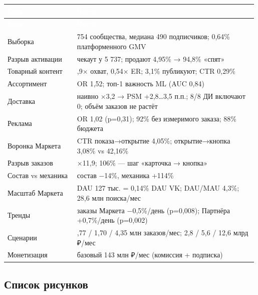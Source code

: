 \documentclass[10pt,a4paper]{article}
\begin{document}
\begingroup
\small
\setlength{\tabcolsep}{3pt}
\renewcommand{\arraystretch}{1.12}
\begin{longtable}{@{}>{\raggedright\arraybackslash}p{0.2778\linewidth}>{\raggedright\arraybackslash}p{0.7099\linewidth}@{}}
\rowcolor{blue}
\textcolor{white}{\textbf{Блок}} & \textcolor{white}{\textbf{Число}} \\
\endfirsthead
\rowcolor{blue}
\textcolor{white}{\textbf{Блок}} & \textcolor{white}{\textbf{Число}} \\
\endhead
\hline
Выборка & 9 754 сообщества, медиана 490 подписчиков; 0,64\% платформенного GMV \\
Разрыв активации & чекаут у 5 737; продают 4,95\% → 94,8\% «спят» \\
Товарный контент & 1,9× охват, 0,54× ER; 3,1\% публикуют; CTR 0,29\% \\
Ассортимент & OR 1,52; топ-1 важность ML (AUC 0,84) \\
Доставка & наивно ×3,2 → PSM +2,8…3,5 п.п.; 8/8 ДИ включают 0; объём заказов не растёт \\
Реклама & OR 1,02 (p=0,31); 92\% без измеримого заказа; 88\% бюджета \\
Воронка Маркета & CTR показа→открытие 4,05\%; открытие→кнопка 3,08\% vs 42,16\% \\
Разрыв заказов & ×11,9; 106\% — шаг «карточка → кнопка» \\
Состав vs механика & состав −14\%, механика +114\% \\
Масштаб Маркета & DAU 127 тыс. = 0,14\% DAU VK; DAU/MAU 4,3\%; 28,6 млн поиска/мес \\
Тренды & заказы Маркета −0,5\%/день (p=0,008); Партнёра +0,7\%/день (p=0,002) \\
Сценарии & 0,77 / 1,70 / 4,35 млн заказов/мес; 2,8 / 5,6 / 12,6 млрд ₽/мес \\
Монетизация & базовый 143 млн ₽/мес (комиссия + подписка) \\
\hline
\end{longtable}
\endgroup
\vspace{4pt}

\subsection{Список рисунков}
\end{document}
